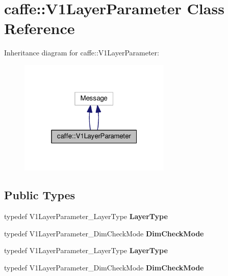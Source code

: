 \hypertarget{classcaffe_1_1_v1_layer_parameter}{}\section{caffe\+:\+:V1\+Layer\+Parameter Class Reference}
\label{classcaffe_1_1_v1_layer_parameter}


Inheritance diagram for caffe\+:\+:V1\+Layer\+Parameter\+:
\nopagebreak
\begin{figure}[H]
\begin{center}
\leavevmode
\includegraphics[width=205pt]{classcaffe_1_1_v1_layer_parameter__inherit__graph}
\end{center}
\end{figure}
\subsection*{Public Types}
\begin{DoxyCompactItemize}
\item 
\mbox{\label{classcaffe_1_1_v1_layer_parameter_aa4b79d9b8bf485ecfbb724a8003ed02f}} 
typedef V1\+Layer\+Parameter\+\_\+\+Layer\+Type {\bfseries Layer\+Type}
\item 
\mbox{\label{classcaffe_1_1_v1_layer_parameter_a8958643467af34b87822ce392e644f07}} 
typedef V1\+Layer\+Parameter\+\_\+\+Dim\+Check\+Mode {\bfseries Dim\+Check\+Mode}
\item 
\mbox{\label{classcaffe_1_1_v1_layer_parameter_aa4b79d9b8bf485ecfbb724a8003ed02f}} 
typedef V1\+Layer\+Parameter\+\_\+\+Layer\+Type {\bfseries Layer\+Type}
\item 
\mbox{\label{classcaffe_1_1_v1_layer_parameter_a8958643467af34b87822ce392e644f07}} 
typedef V1\+Layer\+Parameter\+\_\+\+Dim\+Check\+Mode {\bfseries Dim\+Check\+Mode}
\end{DoxyCompactItemize}
